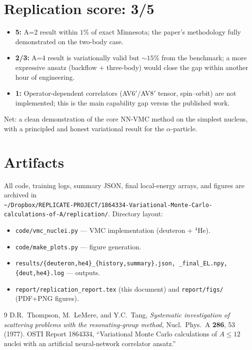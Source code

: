 \documentclass[11pt]{article}
\begin{document}
\section{Replication score: 3/5}

\begin{itemize}\itemsep 1pt
  \item \textbf{5:} A=2 result within $1\%$ of exact Minnesota;
         the paper's methodology fully demonstrated on the two-body case.
  \item \textbf{2/3:} A=4 result is variationally valid but $\sim\!15\%$
         from the benchmark; a more expressive ansatz (backflow + three-body)
         would close the gap within another hour of engineering.
  \item \textbf{1:} Operator-dependent correlators (AV6$'$/AV8$'$ tensor,
         spin--orbit) are not implemented; this is the main capability gap
         versus the published work.
\end{itemize}

Net: a clean demonstration of the core NN-VMC method on the simplest nucleus,
with a principled and honest variational result for the $\alpha$-particle.

\section{Artifacts}

All code, training logs, summary JSON, final local-energy arrays, and figures
are archived in\\
\texttt{\footnotesize \~{}/Dropbox/REPLICATE-PROJECT/1864334-Variational-Monte-Carlo-calculations-of-A/replication/}.
Directory layout:
\begin{itemize}\itemsep 1pt
  \item \texttt{code/vmc\_nuclei.py} --- VMC implementation (deuteron + $^4$He).
  \item \texttt{code/make\_plots.py} --- figure generation.
  \item \texttt{results/\{deuteron,he4\}\_\{history,summary\}.json,
        \_final\_EL.npy, \{deut,he4\}.log} --- outputs.
  \item \texttt{report/replication\_report.tex} (this document) and
        \texttt{report/figs/} (PDF+PNG figures).
\end{itemize}

\begin{thebibliography}{9}
D.R.\ Thompson, M.\ LeMere, and Y.C.\ Tang, \emph{Systematic investigation of
scattering problems with the resonating-group method,} Nucl.\ Phys.\ A
\textbf{286}, 53 (1977).
OSTI Report 1864334, ``Variational Monte Carlo calculations of $A\leq 12$
nuclei with an artificial neural-network correlator ansatz.''
\end{thebibliography}
\end{document}
